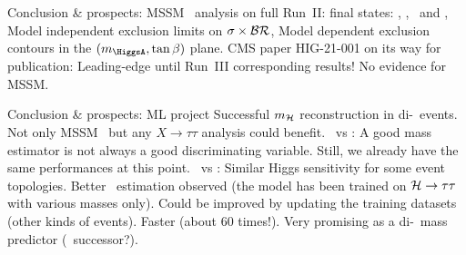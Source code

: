 \begin{frame}{Conclusion \& prospects: \HAtoTauTau}
\manip MSSM \HAtoTauTau\ analysis on full Run~II:
 final states: \tauh\tauh, \mu\tauh, \ele\tauh\ and \ele\mu,
\submanip Model independent exclusion limits on $\sigma\times\mathcal{BR}$,
\submanip Model dependent exclusion contours in the $(m_{\HiggsA}, \tan\beta)$ plane.
\manip CMS paper HIG-21-001 on its way for publication:
\submanip Leading-edge until Run~III corresponding results!
\manip No evidence for MSSM.
\end{frame}

\begin{frame}{Conclusion \& prospects: ML project}
\manip Successful $m_{\mathcal{H}}$ reconstruction in di-\tau\ events.
\submanip Not only MSSM \HAtoTauTau\ but any $X\to\tau\tau$ analysis could benefit.
\manip \mml\ vs \mTtot:
\submanip A good mass estimator is not always a good discriminating variable.
\submanip Still, we already have the same performances at this point.
\manip \mml\ vs \msv:
\submanip Similar Higgs sensitivity for some event topologies.
\submanip Better \Zboson\ estimation observed (the model has been trained on $\mathcal{H}\to\tau\tau$ with various masses only).
\submanip Could be improved by updating the training datasets (other kinds of events).
\submanip Faster (about 60 times!).
\manip Very promising as a di-\tau\ mass predictor (\SVFIT\ successor?).
\end{frame}

